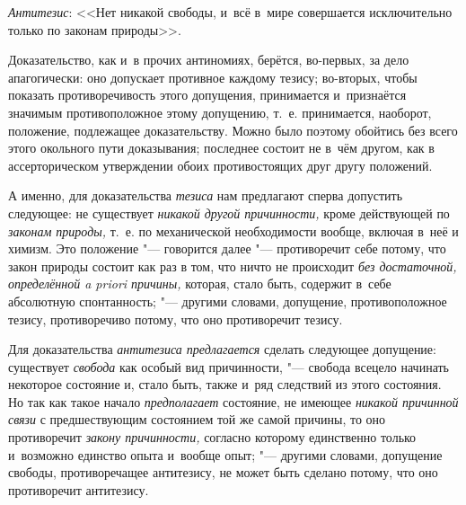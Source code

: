 {\em Антитезис}: <<Нет
никакой свободы, и~всё в~мире совершается исключительно только по законам
природы>>.

Доказательство, как и~в прочих антиномиях, берётся, во-первых,
за дело апагогически: оно допускает противное каждому тезису; во-вторых,
чтобы показать противоречивость этого допущения, принимается и~признаётся
значимым противоположное этому допущению, т.~е. принимается, наоборот,
положение, подлежащее доказательству. Можно было поэтому обойтись без всего
этого окольного пути доказывания; последнее состоит не в~чём другом, как в
ассерторическом утверждении обоих противостоящих друг другу положений.

А именно, для доказательства
{\em тезиса} нам
предлагают сперва допустить следующее: не существует
{\em никакой другой причинности,}
кроме действующей по
{\em законам природы,}
т.~е. по механической необходимости вообще, включая в~неё и
химизм. Это положение "--- говорится далее
"--- противоречит себе потому, что закон природы состоит как раз
в том, что ничто не происходит {\em без
достаточной, определённой a priori причины,} которая, стало
быть, содержит в~себе абсолютную спонтанность; "--- другими
словами, допущение, противоположное тезису, противоречиво потому, что оно
противоречит тезису.

Для доказательства
{\em антитезиса предлагается}
сделать следующее допущение: существует
{\em свобода} как особый
вид причинности, "--- свобода всецело начинать некоторое
состояние и, стало быть, также и~ряд следствий из этого состояния. Но так
как такое начало {\em предполагает}
состояние, не имеющее
{\em никакой причинной связи}
с предшествующим состоянием той же самой причины, то оно
противоречит {\em закону причинности,}
согласно которому единственно только и~возможно единство
опыта и~вообще опыт; "--- другими словами, допущение свободы,
противоречащее антитезису, не может быть сделано потому, что оно
противоречит антитезису.

